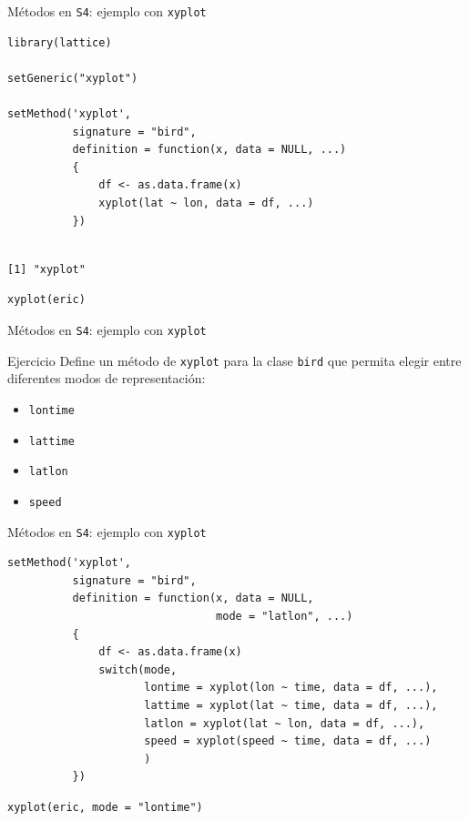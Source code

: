 \documentclass[xcolor={usenames,svgnames,dvipsnames}]{beamer}
\begin{document}
\begin{frame}[label={sec:org3da7b95},fragile]{Métodos en \texttt{S4}: ejemplo con \texttt{xyplot}}
 \lstset{language=r,label= ,caption= ,captionpos=b,numbers=none}
\begin{lstlisting}
library(lattice)

setGeneric("xyplot")

setMethod('xyplot',
          signature = "bird",
          definition = function(x, data = NULL, ...)
          {
              df <- as.data.frame(x)
              xyplot(lat ~ lon, data = df, ...)
          })    
\end{lstlisting}

\begin{verbatim}

[1] "xyplot"
\end{verbatim}


\lstset{language=r,label= ,caption= ,captionpos=b,numbers=none}
\begin{lstlisting}
xyplot(eric)
\end{lstlisting}
\end{frame}


\begin{frame}[label={sec:orgc5bd613},fragile]{Métodos en \texttt{S4}: ejemplo con \texttt{xyplot}}
 \begin{block}{Ejercicio}
Define un método de \texttt{xyplot} para la clase \texttt{bird} que permita elegir entre diferentes modos de representación:
\begin{itemize}
\item \texttt{lontime}
\item \texttt{lattime}
\item \texttt{latlon}
\item \texttt{speed}
\end{itemize}
\end{block}
\end{frame}

\begin{frame}[label={sec:orgd7d381c},fragile]{Métodos en \texttt{S4}: ejemplo con \texttt{xyplot}}
 \lstset{language=r,label= ,caption= ,captionpos=b,numbers=none}
\begin{lstlisting}
setMethod('xyplot',
          signature = "bird",
          definition = function(x, data = NULL,
                                mode = "latlon", ...)
          {
              df <- as.data.frame(x)
              switch(mode,
                     lontime = xyplot(lon ~ time, data = df, ...),
                     lattime = xyplot(lat ~ time, data = df, ...),
                     latlon = xyplot(lat ~ lon, data = df, ...),
                     speed = xyplot(speed ~ time, data = df, ...)
                     )
          })    
\end{lstlisting}

\lstset{language=r,label= ,caption= ,captionpos=b,numbers=none}
\begin{lstlisting}
xyplot(eric, mode = "lontime")
\end{lstlisting}
\end{frame}
\end{document}
